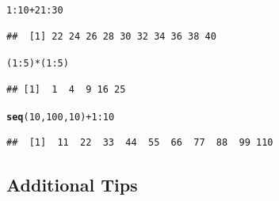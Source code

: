 \documentclass{tufte-book}\usepackage[]{graphicx}\usepackage[]{color}
\makeatletter
\newcommand{\hlnum}[1]{\textcolor[rgb]{0.686,0.059,0.569}{#1}}%
\newcommand{\hlopt}[1]{\textcolor[rgb]{0,0,0}{#1}}%
\newcommand{\hlstd}[1]{\textcolor[rgb]{0.345,0.345,0.345}{#1}}%
\newcommand{\hlkwd}[1]{\textcolor[rgb]{0.737,0.353,0.396}{\textbf{#1}}}%
\newenvironment{kframe}{%
 \def\at@end@of@kframe{}%
 \ifinner\ifhmode%
  \def\at@end@of@kframe{\end{minipage}}%
  \begin{minipage}{\columnwidth}%
 \fi\fi%
 \def\FrameCommand##1{\hskip\@totalleftmargin \hskip-\fboxsep
 \colorbox{shadecolor}{##1}\hskip-\fboxsep
     \hskip-\linewidth \hskip-\@totalleftmargin \hskip\columnwidth}%
 \MakeFramed {\advance\hsize-\width
   \@totalleftmargin\z@ \linewidth\hsize
   \@setminipage}}%
 {\par\unskip\endMakeFramed%
 \at@end@of@kframe}
\newenvironment{knitrout}{}{} %
\makeatother
\begin{document}
\begin{footnotesize}
\begin{knitrout}
\color{fgcolor}\begin{kframe}
\begin{alltt}
\hlnum{1}\hlopt{:}\hlnum{10} \hlopt{+} \hlnum{21}\hlopt{:}\hlnum{30}
\end{alltt}
\begin{verbatim}
##  [1] 22 24 26 28 30 32 34 36 38 40
\end{verbatim}
\begin{alltt}
\hlstd{(}\hlnum{1}\hlopt{:}\hlnum{5}\hlstd{)} \hlopt{*} \hlstd{(}\hlnum{1}\hlopt{:}\hlnum{5}\hlstd{)}
\end{alltt}
\begin{verbatim}
## [1]  1  4  9 16 25
\end{verbatim}
\begin{alltt}
\hlkwd{seq}\hlstd{(}\hlnum{10}\hlstd{,} \hlnum{100}\hlstd{,} \hlnum{10}\hlstd{)} \hlopt{+} \hlnum{1}\hlopt{:}\hlnum{10}
\end{alltt}
\begin{verbatim}
##  [1]  11  22  33  44  55  66  77  88  99 110
\end{verbatim}
\end{kframe}
\end{knitrout}
\end{footnotesize}

\subsection{Additional Tips}
\end{document}

